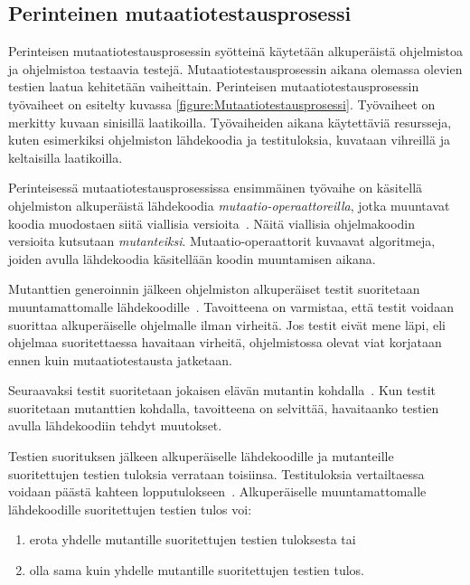 \documentclass[finnish, grading]{tktltiki2}
\theoremstyle{definition}
\theoremstyle{remark}
\begin{document}

\subsection{Perinteinen mutaatiotestausprosessi}

Perinteisen mutaatiotestausprosessin syötteinä käytetään alkuperäistä ohjelmistoa ja ohjelmistoa testaavia testejä. Mutaatiotestausprosessin aikana olemassa olevien testien laatua kehitetään vaiheittain. Perinteisen mutaatiotestausprosessin työvaiheet on esitelty kuvassa \ref{figure:Mutaatiotestausprosessi}. Työvaiheet on merkitty kuvaan sinisillä laatikoilla. Työvaiheiden aikana käytettäviä resursseja, kuten esimerkiksi ohjelmiston lähdekoodia ja testituloksia, kuvataan vihreillä ja keltaisilla laatikoilla.

Perinteisessä mutaatiotestausprosessissa ensimmäinen työvaihe on käsitellä ohjelmiston alkuperäistä lähdekoodia \textit{mutaatio-operaattoreilla}, jotka muuntavat koodia muodostaen siitä viallisia versioita~\cite[s. 869]{Ma:Harrold:Kwon:2006}. Näitä viallisia ohjelmakoodin versioita kutsutaan \textit{mutanteiksi}. Mutaatio-operaattorit kuvaavat algoritmeja, joiden avulla lähdekoodia käsitellään koodin muuntamisen aikana.

Mutanttien generoinnin jälkeen ohjelmiston alkuperäiset testit suoritetaan muuntamattomalle lähdekoodille~\cite[s. 652]{Jia:Harman:2011}. Tavoitteena on varmistaa, että testit voidaan suorittaa alkuperäiselle ohjelmalle ilman virheitä. Jos testit eivät mene läpi, eli ohjelmaa suoritettaessa havaitaan virheitä, ohjelmistossa olevat viat korjataan ennen kuin mutaatiotestausta jatketaan. 

Seuraavaksi testit suoritetaan jokaisen elävän mutantin kohdalla~\cite[s. 35]{Offutt:Untch:2001}. Kun testit suoritetaan mutanttien kohdalla, tavoitteena on selvittää, havaitaanko testien avulla lähdekoodiin tehdyt muutokset. 

Testien suorituksen jälkeen alkuperäiselle lähdekoodille ja mutanteille suoritettujen testien tuloksia verrataan toisiinsa. Testituloksia vertailtaessa voidaan päästä kahteen lopputulokseen~\cite[s. 36]{DeMillo:Lipton:Sayward:1978}. Alkuperäiselle muuntamattomalle lähdekoodille suoritettujen testien tulos voi: 
\begin{enumerate}
  \item erota yhdelle mutantille suoritettujen testien tuloksesta tai
  \item olla sama kuin yhdelle mutantille suoritettujen testien tulos.
\end{enumerate}
\end{document}
